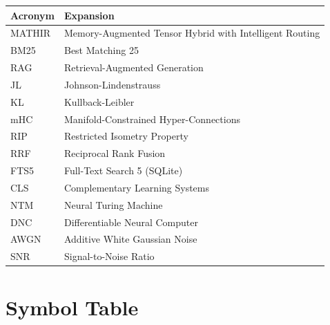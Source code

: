 \documentclass[12pt,a4paper]{article}
\theoremstyle{definition}
\theoremstyle{remark}
\begin{document}
\begin{table}[H]
\centering
\begin{tabular}{ll}
\toprule
\textbf{Acronym} & \textbf{Expansion} \\
\midrule
MATHIR & Memory-Augmented Tensor Hybrid with Intelligent Routing \\
BM25 & Best Matching 25 \\
RAG & Retrieval-Augmented Generation \\
JL & Johnson-Lindenstrauss \\
KL & Kullback-Leibler \\
mHC & Manifold-Constrained Hyper-Connections \\
RIP & Restricted Isometry Property \\
RRF & Reciprocal Rank Fusion \\
FTS5 & Full-Text Search 5 (SQLite) \\
CLS & Complementary Learning Systems \\
NTM & Neural Turing Machine \\
DNC & Differentiable Neural Computer \\
AWGN & Additive White Gaussian Noise \\
SNR & Signal-to-Noise Ratio \\
\bottomrule
\end{tabular}
\end{table}

\section{Symbol Table}
\label{app:symbols}
\end{document}

